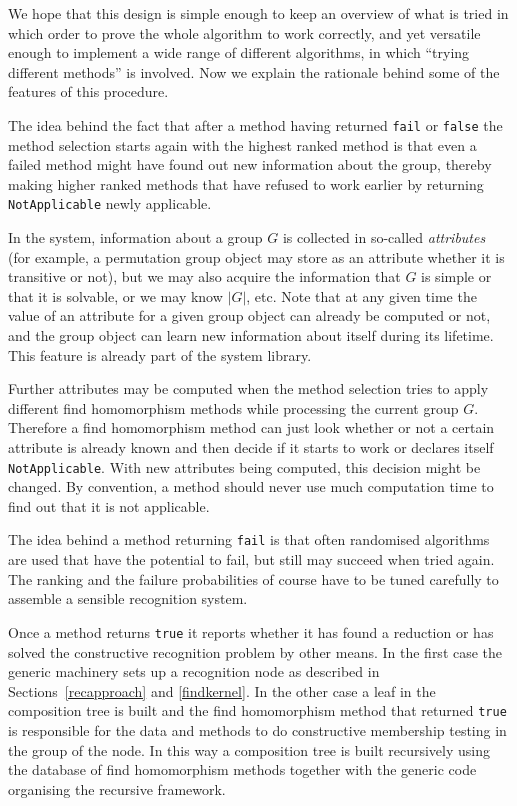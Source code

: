 We hope that this design is simple enough to keep an overview of what is
tried in which order to prove the whole algorithm to work correctly,
and yet versatile enough to implement a wide range of different algorithms,
in which ``trying different methods'' is involved. Now we explain
the rationale behind some of the features of this procedure.

The idea behind the fact that after a method having returned
\texttt{fail} or \texttt{false} the method selection starts again
with the highest ranked method is that even a failed method might
have found out new information about the group, thereby making
higher ranked methods that have refused to work earlier by
returning \texttt{NotApplicable} newly applicable.

In the {\GAP} system, information about a group $G$ is collected in
so-called {\em attributes} (for example,
%
a permutation group object may store as an attribute whether it is transitive
or not), but we may also acquire the information that 
$G$ is simple or that it is solvable, or we may know $|G|$, etc. 
Note that at any given time the value of an attribute for a given group
object can already be computed or not, and the group object can learn new
information about itself during its lifetime. This feature is already
part of the {\GAP} system library. 

Further attributes may be
computed when the method selection tries to apply
different find homomorphism methods while processing the current group $G$.
Therefore a find homomorphism method can just look whether or not
a certain attribute is already known and then decide if it starts
to work or declares itself \texttt{NotApplicable}. With new attributes
being computed, this decision might be changed. By convention, a method
should never use much computation time to find out that it is not
applicable.

The idea behind a method returning \texttt{fail} is that often
randomised algorithms are used that have the potential to fail,
but still may succeed when tried again. The ranking and the failure 
probabilities of course have to be tuned carefully to assemble
a sensible recognition system.

Once a method returns \texttt{true} it reports whether it has found a
reduction or has solved the constructive recognition problem by other
means. In the first case the generic machinery sets up a recognition node
as described in Sections~\ref{recapproach} and \ref{findkernel}. In the
other case a leaf in the composition tree is built and the find
%
homomorphism method that returned \texttt{true} is responsible for the
data and methods to do constructive membership testing in the group 
of the node. In this way a composition tree is built recursively using the
database of find homomorphism methods together with the generic code
organising the recursive framework.

